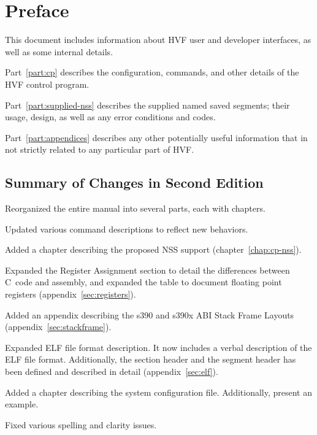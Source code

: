 \chapter*{Preface}
This document includes information about HVF user and developer interfaces,
as well as some internal details.

\cbstart
Part~\ref{part:cp} describes the configuration, commands, and other
details of the HVF control program.

Part~\ref{part:supplied-nss} describes the supplied named saved segments;
their usage, design, as well as any error conditions and codes.

Part~\ref{part:appendices} describes any other potentially useful
information that in not strictly related to any particular part of HVF.
\cbend

\cbstart
\section*{Summary of Changes in Second Edition}
Reorganized the entire manual into several parts, each with chapters.

Updated various command descriptions to reflect new behaviors.

Added a chapter describing the proposed NSS support (chapter~\ref{chap:cp-nss}).

Expanded the Register Assignment section to detail the differences between
C~code and assembly, and expanded the table to document floating point
registers (appendix~\ref{sec:registers}).

Added an appendix describing the s390 and s390x ABI Stack Frame Layouts
(appendix~\ref{sec:stackframe}).

Expanded ELF file format description.  It now includes a verbal description
of the ELF file format.  Additionally, the section header and the segment
header has been defined and described in detail (appendix~\ref{sec:elf}).

Added a chapter describing the system configuration file.  Additionally,
present an example.

Fixed various spelling and clarity issues.
\cbend
